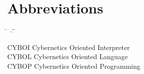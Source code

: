 %
%
%
%
%

%
%
%

\section[Abbreviations]{Abbreviations}
\label{abbreviations_heading}

\begin{tabbing}
    \hspace{1cm} \= \hspace{2cm} -- \= \hspace{1.5cm}\= \kill

    \>CYBOI \>\>Cybernetics Oriented Interpreter\\

    \>CYBOL \>\>Cybernetics Oriented Language\\

    \>CYBOP \>\>Cybernetics Oriented Programming\\
\end{tabbing}

